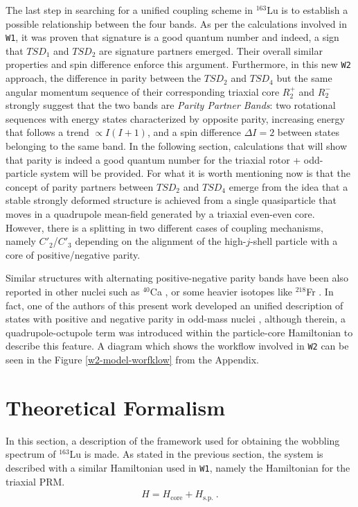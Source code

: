 \documentclass[11pt]{article}
\begin{document}
The last step in searching for a unified coupling scheme in $^{163}$Lu is to establish a possible relationship between the four bands. As per the calculations involved in \texttt{W1}, it was proven that signature is a good quantum number and indeed, a sign that $TSD_1$ and $TSD_2$ are signature partners emerged. Their overall similar properties and spin difference enforce this argument. Furthermore, in this new \texttt{W2} approach, the difference in parity between the $TSD_2$ and $TSD_4$ but the same angular momentum sequence of their corresponding triaxial core $R_2^+$ and $R_2^-$ strongly suggest that the two bands are \emph{Parity Partner Bands}: two rotational sequences with energy states characterized by opposite parity, increasing energy that follows a trend $\propto I(I+1)$, and a spin difference $\Delta I=2$ between states belonging to the same band. In the following section, calculations that will show that parity is indeed a good quantum number for the triaxial rotor + odd-particle system will be provided. For what it is worth mentioning now is that the concept of parity partners between $TSD_2$ and $TSD_4$ emerge from the idea that a stable strongly deformed structure is achieved from a single quasiparticle that moves in a quadrupole mean-field generated by a triaxial even-even core. However, there is a splitting in two different cases of coupling mechanisms, namely $C'_2$/$C'_3$ depending on the alignment of the high-$j$-shell particle with a core of positive/negative parity.

Similar structures with alternating positive-negative parity bands have been also reported in other nuclei such as $^{40}$Ca \cite{torilov2004spectroscopy}, or some heavier isotopes like $^{218}$Fr \cite{debray2000alternating}. In fact, one of the authors of this present work developed an unified description of states with positive and negative parity in odd-mass nuclei \cite{radutaa2009csm,raduta2011simultaneous}, although therein, a quadrupole-octupole term was introduced within the particle-core Hamiltonian to describe this feature. A diagram which shows the workflow involved in \texttt{W2} can be seen in the Figure \ref{w2-model-worfklow} from the Appendix.

\section{Theoretical Formalism}
\label{section-theory}

In this section, a description of the framework used for obtaining the wobbling spectrum of $^{163}$Lu is made. As stated in the previous section, the system is described with a similar Hamiltonian used in \texttt{W1}, namely the Hamiltonian for the triaxial PRM.
\begin{align}
    H=H_\text{core}+H_\text{s.p.}\ .
    \label{prm-hamiltonian}
\end{align}
\end{document}
